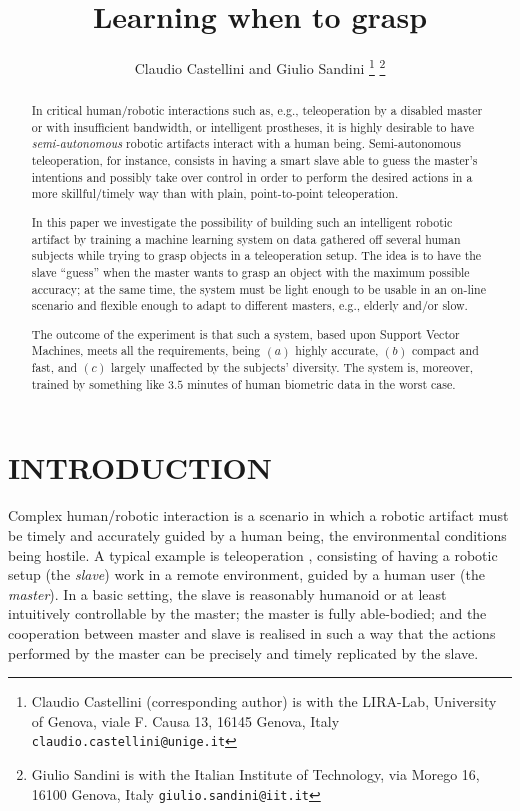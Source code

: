 \documentclass[a4paper,10pt,conference]{ieeeconf}
\title{\LARGE \bf Learning when to grasp}
\author{Claudio Castellini and Giulio Sandini%
\thanks{Claudio Castellini (corresponding author) is
with the LIRA-Lab, University of Genova,
viale F. Causa 13, 16145 Genova, Italy
{\tt\small claudio.castellini@unige.it}}%
\thanks{Giulio Sandini is with the Italian Institute of Technology,
via Morego 16, 16100 Genova, Italy
{\tt\small giulio.sandini@iit.it}}%
}
\begin{document}
\maketitle
\thispagestyle{empty}
\pagestyle{empty}

\begin{abstract}

In critical human/robotic interactions such as, e.g., teleoperation by
a disabled master or with insufficient bandwidth, or intelligent
prostheses, it is highly desirable to have \emph{semi-autonomous}
robotic artifacts interact with a human being. Semi-autonomous
teleoperation, for instance, consists in having a smart slave able to
guess the master's intentions and possibly take over control in order
to perform the desired actions in a more skillful/timely way than with
plain, point-to-point teleoperation.

In this paper we investigate the possibility of building such an
intelligent robotic artifact by training a machine learning system on
data gathered off several human subjects while trying to grasp objects
in a teleoperation setup. The idea is to have the slave ``guess'' when
the master wants to grasp an object with the maximum possible
accuracy; at the same time, the system must be light enough to be
usable in an on-line scenario and flexible enough to adapt to
different masters, e.g., elderly and/or slow.

The outcome of the experiment is that such a system, based upon
Support Vector Machines, meets all the requirements, being $(a)$
highly accurate, $(b)$ compact and fast, and $(c)$ largely unaffected
by the subjects' diversity. The system is, moreover, trained by
something like $3.5$ minutes of human biometric data in the worst
case.

\end{abstract}

\section{INTRODUCTION}

Complex human/robotic interaction is a scenario in which a robotic
artifact must be timely and accurately guided by a human being, the
environmental conditions being hostile. A typical example is
teleoperation \cite{...}, consisting of having a robotic setup (the
\emph{slave}) work in a remote environment, guided by a human user
(the \emph{master}). In a basic setting, the slave is reasonably
humanoid or at least intuitively controllable by the master; the
master is fully able-bodied; and the cooperation between master and
slave is realised in such a way that the actions performed by the
master can be precisely and timely replicated by the slave.
\end{document}
